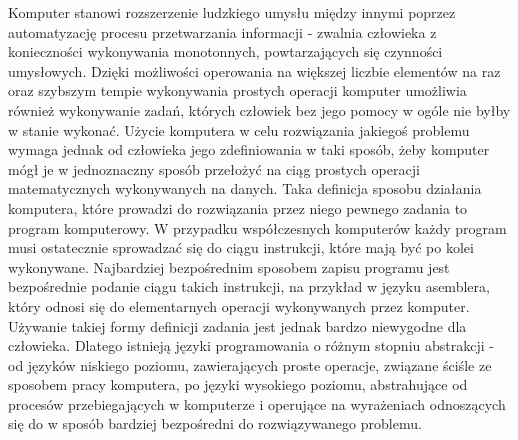 Komputer stanowi rozszerzenie ludzkiego umysłu między innymi poprzez automatyzację procesu przetwarzania informacji - zwalnia człowieka z konieczności wykonywania monotonnych, powtarzających się czynności umysłowych. Dzięki możliwości operowania na większej liczbie elementów na raz oraz szybszym tempie wykonywania prostych operacji komputer umożliwia również wykonywanie zadań, których człowiek bez jego pomocy w ogóle nie byłby w stanie wykonać. Użycie komputera w celu rozwiązania jakiegoś problemu wymaga jednak od człowieka jego zdefiniowania w taki sposób, żeby komputer mógł je w jednoznaczny sposób przełożyć na ciąg prostych operacji matematycznych wykonywanych na danych. Taka definicja sposobu działania komputera, które prowadzi do rozwiązania przez niego pewnego zadania to program komputerowy. W przypadku współczesnych komputerów każdy program musi ostatecznie sprowadzać się do ciągu instrukcji, które mają być po kolei wykonywane. Najbardziej bezpośrednim sposobem zapisu programu jest bezpośrednie podanie ciągu takich instrukcji, na przykład w języku asemblera, który odnosi się do elementarnych operacji wykonywanych przez komputer. Używanie takiej formy definicji zadania jest jednak bardzo niewygodne dla człowieka. Dlatego istnieją języki programowania o różnym stopniu abstrakcji - od języków niskiego poziomu, zawierających proste operacje, związane ściśle ze sposobem pracy komputera, po języki wysokiego poziomu, abstrahujące od procesów przebiegających w komputerze i operujące na wyrażeniach odnoszących się do w sposób bardziej bezpośredni do rozwiązywanego problemu.

